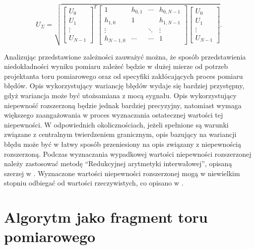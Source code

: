 \begin{equation}
U_{\Sigma} = \sqrt{
\begin{bmatrix}
U_{0} \\ U_{1} \\ \vdots \\ U_{N-1}
\end{bmatrix}^{T}
\begin{bmatrix}
1         & h_{0,1} & \cdots & h_{0,N-1} \\
h_{1,0}   & 1       &        & h_{1,N-1} \\
\vdots    &         & \ddots & \vdots    \\
h_{N-1,0} & \cdots  & \cdots & 1
\end{bmatrix}
\begin{bmatrix}
U_{0} \\ U_{1} \\ \vdots \\ U_{N-1}
\end{bmatrix}}
\label{eq:unc_matrix}.
\end{equation}

Analizując przedstawione zależności zauważyć można, że sposób przedstawienia niedokładności wyniku pomiaru zależeć będzie w dużej mierze od potrzeb projektanta toru pomiarowego oraz od specyfiki zakłócających proces pomiaru błędów. Opis wykorzystujący wariancję błędów wydaje się bardziej przystępny, gdyż wariancja może być utożsamiana z mocą sygnału. Opis wykorzystujący niepewność rozszerzoną będzie jednak bardziej precyzyjny, natomiast wymaga większego zaangażowania w proces wyznaczania ostatecznej wartości tej niepewności. W odpowiednich okolicznościach, jeżeli spełnione są warunki związane z centralnym twierdzeniem granicznym, opis bazujący na wariancji błędu może być w łatwy sposób przeniesiony na opis związany z niepewnością rozszerzoną. Podczas wyznaczania wypadkowej wartości niepewności rozszerzonej należy zastosować metodę \enquote{Redukcyjnej arytmetyki interwałowej}, opisaną szerzej w \cite{jakubiec_reductive, jakubiec_arithmetic, batko_uncertainty}. Wyznaczone wartości niepewności rozszerzonej mogą w niewielkim stopniu odbiegać od wartości rzeczywistych, co opisano w \cite{jakubiec_arithmetic, jakubiec_model}.

\section{Algorytm jako fragment toru pomiarowego}

